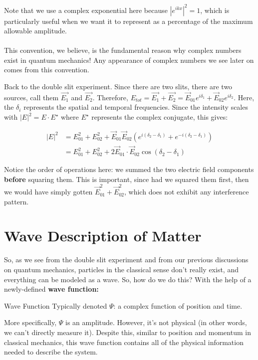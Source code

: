           \begin{insight*}{}{}
              Note that we use a complex exponential here because $|e^{ikx}|^2 = 1$, which is particularly useful when we want it to represent as a percentage of the maximum allowable amplitude.\\\\
              This convention, we believe, is the fundamental reason why complex numbers exist in quantum mechanics! Any appearance of complex numbers we see later on comes from this convention.
          \end{insight*}

          Back to the double slit experiment. Since there are two slits, there are two sources, call them $\vec{E_1}$ and $\vec{E_2}$. Therefore, $E_{tot} = \vec{E_1} + \vec{E_2} = \vec{E}_{01}e^{i\delta_1} + \vec{E}_{02}e^{i\delta_2}$. Here, the $\delta_i$ represents the spatial and temporal frequencies. Since the intensity scales with $|E|^2 = E \cdot E^\star$ where $E^\star$ represents the complex conjugate, this gives:

          \begin{align*}
              |E|^2 &= E_{01}^2 + E_{02}^2 + \vec{E}_{01}\vec{E}_{02}\left(e^{i(\delta_2 - \delta_1)} + e^{-i(\delta_2 - \delta_1)}\right)\\
              &= E_{01}^2 + E_{02}^2 + 2\vec{E}_{01}\cdot \vec{E}_{02}\cos(\delta_2 - \delta_1)
          \end{align*}

          Notice the order of operations here: we summed the two electric field components \textbf{before} squaring them. This is important, since had we squared them first, then we would have simply gotten $\vec E_{01}^2 + \vec E_{02}^2$, which does not exhibit any interference pattern.

      \section{Wave Description of Matter}
          So, as we see from the double slit experiment and from our previous discussions on quantum mechanics, particles in the classical sense don't really exist, and everything can be modeled as a wave. So, how do we do this? With the help of a newly-defined \textbf{wave function:}
          \begin{definition}{Wave Function}{}
              Typically denoted $\Psi$: a complex function of position and time.
          \end{definition}
          More specifically, $\Psi$ is an amplitude. However, it's not physical (in other words, we can't directly measure it). Despite this, similar to position and momentum in classical mechanics, this wave function contains all of the physical information needed to describe the system.

